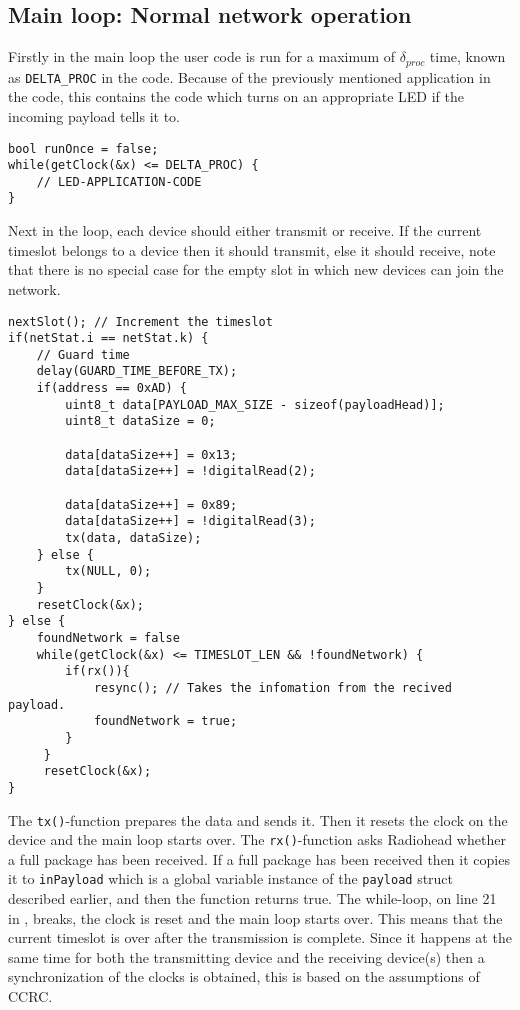 \subsection{Main loop: Normal network operation}
Firstly in the main loop the user code is run for a maximum of $\delta_{proc}$ time, known as \texttt{DELTA\_PROC} in the code.
Because of the previously mentioned application in the code, this contains the code which turns on an appropriate LED if the incoming payload tells it to. 

\begin{lstlisting}[style=customc,caption={While-loop with application code.},label={lst:ccrc:usercode}]
bool runOnce = false;
while(getClock(&x) <= DELTA_PROC) {
    // LED-APPLICATION-CODE
}
\end{lstlisting}

Next in the loop, each device should either transmit or receive. 
If the current timeslot belongs to a device then it should transmit, else it should receive, note that there is no special case for the empty slot in which new devices can join the network. 

\begin{lstlisting}[style=customc,caption={Main loop deciding whether to transmit or receive.},label={lst:ccrc:rxortx}]
nextSlot(); // Increment the timeslot
if(netStat.i == netStat.k) {
    // Guard time
    delay(GUARD_TIME_BEFORE_TX);
    if(address == 0xAD) { 
        uint8_t data[PAYLOAD_MAX_SIZE - sizeof(payloadHead)];
        uint8_t dataSize = 0;
        
        data[dataSize++] = 0x13;
        data[dataSize++] = !digitalRead(2);

        data[dataSize++] = 0x89;
        data[dataSize++] = !digitalRead(3);
        tx(data, dataSize);
    } else {
        tx(NULL, 0);
    }
    resetClock(&x);
} else {
    foundNetwork = false
    while(getClock(&x) <= TIMESLOT_LEN && !foundNetwork) {
        if(rx()){
            resync(); // Takes the infomation from the recived payload.
            foundNetwork = true;
        }
     }
     resetClock(&x);
}
\end{lstlisting}

The \texttt{tx()}-function prepares the data and sends it.
Then it resets the clock on the device and the main loop starts over.
The \texttt{rx()}-function asks Radiohead whether a full package has been received. 
If a full package has been received then it copies it to \texttt{inPayload} which is a global variable instance of the \texttt{payload} struct described earlier, and then the function returns true.
The while-loop, on line 21 in , breaks, the clock is reset and the main loop starts over. 
This means that the current timeslot is over after the transmission is complete.
Since it happens at the same time for both the transmitting device and the receiving device(s) then a synchronization of the clocks is obtained, this is based on the assumptions of CCRC. 
